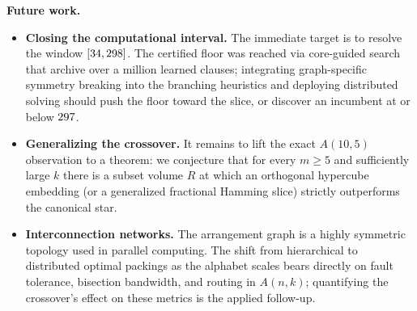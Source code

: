 \textbf{Future work.}
\begin{itemize}
\item \textbf{Closing the computational interval.} The immediate target is to
resolve the window $[34{}, 298{}]$.  The certified floor was
reached via core-guided search that archive over a million learned clauses;
integrating graph-specific symmetry breaking into the branching heuristics and
deploying distributed solving should push the floor toward the slice, or
discover an incumbent at or below $297{}$.
\item \textbf{Generalizing the crossover.} It remains to lift the exact
$A(10,5)$ observation to a theorem: we conjecture that for every $m \ge 5$ and
sufficiently large $k$ there is a subset volume $R$ at which an orthogonal
hypercube embedding (or a generalized fractional Hamming slice) strictly
outperforms the canonical star.
\item \textbf{Interconnection networks.} The arrangement graph is a highly
symmetric topology used in parallel computing.  The shift from hierarchical to
distributed optimal packings as the alphabet scales bears directly on fault
tolerance, bisection bandwidth, and routing in $A(n,k)$; quantifying the
crossover's effect on these metrics is the applied follow-up.
\end{itemize}
